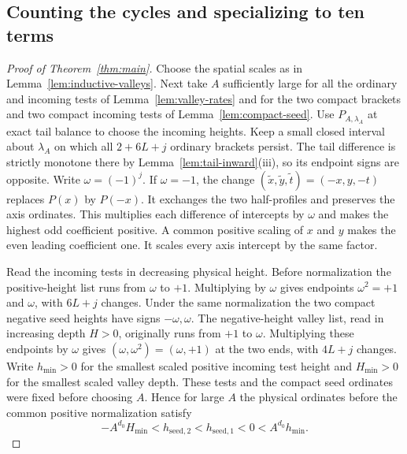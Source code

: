 \subsection{Counting the cycles and specializing to ten terms}\label{subsec:ten-power}\label{sec:finite-inputs}

\begin{proof}[Proof of Theorem~\ref{thm:main}]
Choose the spatial scales as in Lemma~\ref{lem:inductive-valleys}. Next
take $A$ sufficiently large for all the ordinary and incoming tests
of Lemma~\ref{lem:valley-rates} and for the two compact brackets and
two compact incoming tests of Lemma~\ref{lem:compact-seed}. Use
$P_{A,\lambda_A}$ at exact tail balance to choose the incoming heights.
Keep a small closed interval about $\lambda_A$ on which all $2+6L+j$
ordinary brackets persist. The tail difference is strictly monotone
there by Lemma~\ref{lem:tail-inward}(iii), so its endpoint signs are
opposite. Write $\omega=(-1)^j$.
If $\omega=-1$, the change $(\widetilde x,\widetilde y,\widetilde t)
=(-x,y,-t)$ replaces $P(x)$ by $P(-x)$. It exchanges the two
half-profiles and preserves the axis ordinates. This multiplies each difference of intercepts by
$\omega$ and makes the highest odd coefficient positive.
A common positive scaling of $x$ and $y$ makes the even leading
coefficient one. It scales every axis intercept by the same factor.

Read the incoming tests in decreasing physical height. Before
normalization the positive-height list runs from $\omega$ to $+1$.
Multiplying by $\omega$ gives endpoints $\omega^2=+1$ and $\omega$,
with $6L+j$ changes. Under the same normalization the two compact
negative seed heights have signs $-\omega,\omega$. The negative-height
valley list, read in increasing depth $H>0$, originally runs from $+1$
to $\omega$. Multiplying these endpoints by $\omega$ gives
$(\omega,\omega^2)=(\omega,+1)$ at the two ends, with $4L+j$ changes. Write $h_{\min}>0$ for the smallest
scaled positive incoming test height and $H_{\min}>0$ for the smallest
scaled valley depth. These tests and the compact seed ordinates were
fixed before choosing $A$. Hence for large $A$ the physical ordinates
before the common positive normalization satisfy
\[
 -A^{d_0}H_{\min}<h_{\mathrm{seed},2}<h_{\mathrm{seed},1}<0<A^{d_0}h_{\min}.
\]


\end{proof}
